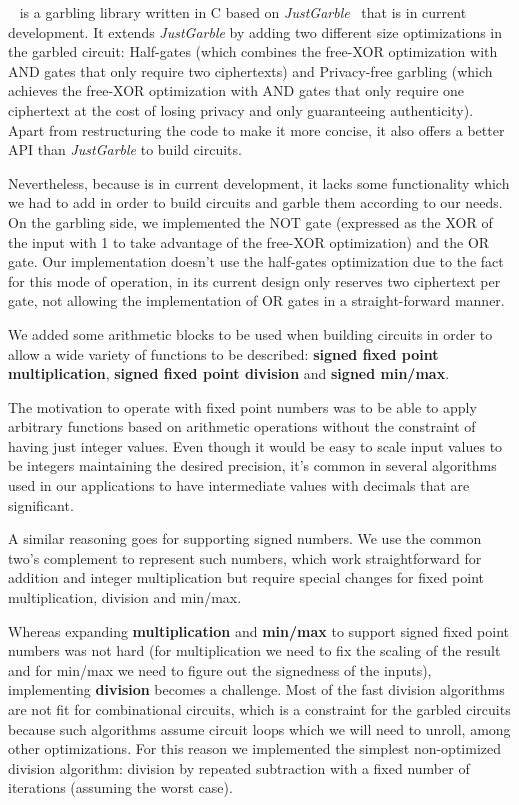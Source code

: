 \libgarble{}~\cite{libgarble} is a garbling library written in C based on
\emph{JustGarble}~\cite{justgarble} that is in current development.  It extends
\emph{JustGarble} by adding two different size optimizations in the garbled
circuit: Half-gates (which combines the free-XOR optimization with AND gates
that only require two ciphertexts) and Privacy-free garbling (which achieves
the free-XOR optimization with AND gates that only require one ciphertext at
the cost of losing privacy and only guaranteeing authenticity).  Apart from
restructuring the code to make it more concise, it also offers a better API
than \emph{JustGarble} to build circuits.

Nevertheless, because \libgarble{} is in current development, it lacks some
functionality which we had to add in order to build circuits and garble them
according to our needs.  On the garbling side, we implemented the NOT gate
(expressed as the XOR of the input with 1 to take advantage of the free-XOR
optimization) and the OR gate.  Our implementation doesn't use the half-gates
optimization due to the fact for this mode of operation, \libgarble{} in its
current design only reserves two ciphertext per gate, not allowing the
implementation of OR gates in a straight-forward manner.

We added some arithmetic blocks to be used when building circuits in order to
allow a wide variety of functions to be described: \textbf{signed fixed point
multiplication}, \textbf{signed fixed point division} and \textbf{signed
min/max}.

The motivation to operate with fixed point numbers was to be able to apply
arbitrary functions based on arithmetic operations without the constraint of
having just integer values.  Even though it would be easy to scale input values
to be integers maintaining the desired precision, it's common in several
algorithms used in our applications to have intermediate values with decimals
that are significant.

A similar reasoning goes for supporting signed numbers.  We use the common
two's complement to represent such numbers, which work straightforward for
addition and integer multiplication but require special changes for fixed point
multiplication, division and min/max.

Whereas expanding \textbf{multiplication} and \textbf{min/max} to support
signed fixed point numbers was not hard (for multiplication we need to fix the
scaling of the result and for min/max we need to figure out the signedness of
the inputs), implementing \textbf{division} becomes a challenge.  Most of the
fast division algorithms are not fit for combinational circuits, which is a
constraint for the garbled circuits because such algorithms assume circuit
loops which we will need to unroll, among other optimizations.  For this reason
we implemented the simplest non-optimized division algorithm: division by
repeated subtraction with a fixed number of iterations (assuming the worst
case).

